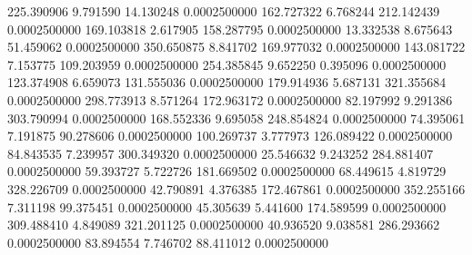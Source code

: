 225.390906 9.791590 14.130248 0.0002500000
162.727322 6.768244 212.142439 0.0002500000
169.103818 2.617905 158.287795 0.0002500000
13.332538 8.675643 51.459062 0.0002500000
350.650875 8.841702 169.977032 0.0002500000
143.081722 7.153775 109.203959 0.0002500000
254.385845 9.652250 0.395096 0.0002500000
123.374908 6.659073 131.555036 0.0002500000
179.914936 5.687131 321.355684 0.0002500000
298.773913 8.571264 172.963172 0.0002500000
82.197992 9.291386 303.790994 0.0002500000
168.552336 9.695058 248.854824 0.0002500000
74.395061 7.191875 90.278606 0.0002500000
100.269737 3.777973 126.089422 0.0002500000
84.843535 7.239957 300.349320 0.0002500000
25.546632 9.243252 284.881407 0.0002500000
59.393727 5.722726 181.669502 0.0002500000
68.449615 4.819729 328.226709 0.0002500000
42.790891 4.376385 172.467861 0.0002500000
352.255166 7.311198 99.375451 0.0002500000
45.305639 5.441600 174.589599 0.0002500000
309.488410 4.849089 321.201125 0.0002500000
40.936520 9.038581 286.293662 0.0002500000
83.894554 7.746702 88.411012 0.0002500000

